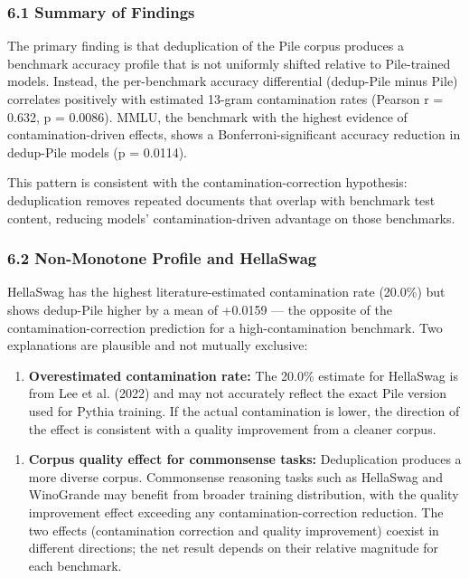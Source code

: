 
\subsubsection{6.1 Summary of Findings}

The primary finding is that deduplication of the Pile corpus produces a benchmark accuracy profile that is not uniformly shifted relative to Pile-trained models. Instead, the per-benchmark accuracy differential (dedup-Pile minus Pile) correlates positively with estimated 13-gram contamination rates (Pearson r = 0.632, p = 0.0086). MMLU, the benchmark with the highest evidence of contamination-driven effects, shows a Bonferroni-significant accuracy reduction in dedup-Pile models (p = 0.0114).

This pattern is consistent with the contamination-correction hypothesis: deduplication removes repeated documents that overlap with benchmark test content, reducing models' contamination-driven advantage on those benchmarks.

\subsubsection{6.2 Non-Monotone Profile and HellaSwag}

HellaSwag has the highest literature-estimated contamination rate (20.0\%) but shows dedup-Pile higher by a mean of +0.0159 --- the opposite of the contamination-correction prediction for a high-contamination benchmark. Two explanations are plausible and not mutually exclusive:

\begin{enumerate}
\item \textbf{Overestimated contamination rate:} The 20.0\% estimate for HellaSwag is from Lee et al. (2022) and may not accurately reflect the exact Pile version used for Pythia training. If the actual contamination is lower, the direction of the effect is consistent with a quality improvement from a cleaner corpus.
\end{enumerate}

\begin{enumerate}
\item \textbf{Corpus quality effect for commonsense tasks:} Deduplication produces a more diverse corpus. Commonsense reasoning tasks such as HellaSwag and WinoGrande may benefit from broader training distribution, with the quality improvement effect exceeding any contamination-correction reduction. The two effects (contamination correction and quality improvement) coexist in different directions; the net result depends on their relative magnitude for each benchmark.
\end{enumerate}

